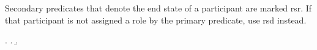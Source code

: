 \documentclass[a4paper]{article}
\begin{document}
Secondary predicates that denote the end state of a participant are marked
\textsf{rsr}. If that participant is not assigned a role by the primary
predicate, use \textsf{rsd} instead.

\ex.
\a. 
\b. 


\appendix

%
%
%
%
%
%
%
%
%
%
%
%
%
%
%
%
%
%
%
%
%
%
%
\end{document}
